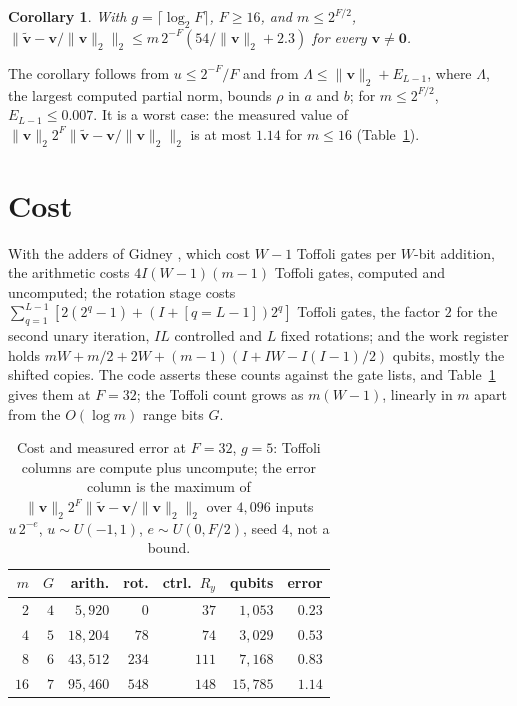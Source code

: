 \documentclass[9pt,twocolumn]{extarticle}
\newcommand{\norm}[1]{\lVert #1\rVert}
\newtheorem{corollary}[proposition]{Corollary}
\begin{document}
\begin{corollary}\label{cor:bound}
With $g = \lceil\log_2F\rceil$, $F \ge 16$, and $m \le 2^{F/2}$,
$\norm{\tilde{\bm v} - \bm v/\norm{\bm v}_2}_2 \le m\,2^{-F}(54/\norm{\bm
v}_2 + 2.3)$ for every $\bm v \ne \bm 0$.
\end{corollary}

The corollary follows from $u \le 2^{-F}/F$ and from $\Lambda \le \norm{\bm
v}_2 + E_{L-1}$, where $\Lambda$, the largest computed partial norm, bounds
$\rho$ in $a$ and $b$; for $m \le 2^{F/2}$, $E_{L-1} \le 0.007$. It is a worst
case: the measured value of $\norm{\bm v}_2 2^F\norm{\tilde{\bm v} - \bm
v/\norm{\bm v}_2}_2$ is at most $1.14$ for $m \le 16$ (Table~\ref{tab:cost}).

\section{Cost}\label{sec:cost}

With the adders of Gidney \cite{gidney2018halving}, which cost $W - 1$ Toffoli gates
per $W$-bit addition, the arithmetic costs $4I(W - 1)(m - 1)$ Toffoli gates,
computed and uncomputed; the rotation stage costs
$\sum_{q=1}^{L-1}[2(2^q - 1) + (I + [q = L - 1])2^q]$ Toffoli gates, the
factor $2$ for the second unary iteration, $IL$
controlled and $L$ fixed rotations; and the work register holds
$mW + m/2 + 2W + (m - 1)(I + IW - I(I - 1)/2)$ qubits, mostly the shifted
copies. The code asserts these counts against the gate lists, and
Table~\ref{tab:cost} gives them at $F = 32$; the Toffoli count grows as
$m(W - 1)$, linearly in $m$ apart from the $O(\log m)$ range bits $G$.

\begin{table}[t]
\centering\small
\caption{Cost and measured error at $F = 32$, $g = 5$: Toffoli columns are
compute plus uncompute; the error column is the maximum of
$\norm{\bm v}_2 2^F\norm{\tilde{\bm v} - \bm v/\norm{\bm v}_2}_2$ over
$4{,}096$ inputs $u\,2^{-e}$, $u \sim U(-1, 1)$, $e \sim U(0, F/2)$, seed
$4$, not a bound.}
\label{tab:cost}
\begin{tabular}{rrrrrrr}
\toprule
$m$ & $G$ & arith. & rot. & ctrl.\ $R_y$ & qubits & error \\
\midrule
$2$  & $4$ & $5{,}920$  & $0$   & $37$  & $1{,}053$  & $0.23$ \\
$4$  & $5$ & $18{,}204$ & $78$  & $74$  & $3{,}029$  & $0.53$ \\
$8$  & $6$ & $43{,}512$ & $234$ & $111$ & $7{,}168$  & $0.83$ \\
$16$ & $7$ & $95{,}460$ & $548$ & $148$ & $15{,}785$ & $1.14$ \\
\bottomrule
\end{tabular}
\end{table}
\end{document}
